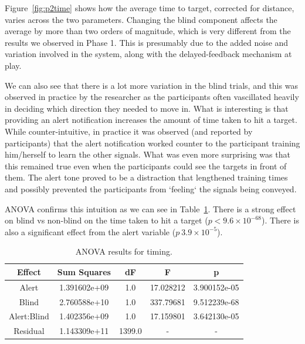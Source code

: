 \documentclass[
hidelinks,
12pt, %
oneside, %
english, %
doublespacing, %
headsepline, %
]{MastersDoctoralThesis} %
\begin{document}
Figure~\ref{fig:p2time} shows how the average time to target, corrected for distance, varies across the two parameters. Changing the blind component affects the average by more than two orders of magnitude, which is very different from the results we observed in Phase 1. This is presumably due to the added noise and variation involved in the system, along with the delayed-feedback mechanism at play.

We can also see that there is a lot more variation in the blind trials, and this was observed in practice by the researcher as the participants often vascillated heavily in deciding which direction they needed to move in. What is interesting is that providing an alert notification increases the amount of time taken to hit a target. While counter-intuitive, in practice it was observed (and reported by participants) that the alert notification worked counter to the participant training him/herself to learn the other signals. What was even more surprising was that this remained true even when the participants could see the targets in front of them. The alert tone proved to be a distraction that lengthened training times and possibly prevented the participants from `feeling` the signals being conveyed.

ANOVA confirms this intuition as we can see in Table~\ref{tab:p2timinganova}. There is a strong effect on blind vs non-blind on the time taken to hit a target ($p < 9.6 \times 10^{-68}$). There is also a significant effect from the alert variable ($p ~ 3.9 \times 10^{-5}$).

\begin{table}
	\centering
	\begin{tabular}{c|cccc}
		\toprule
		Effect & Sum Squares & dF & F & p\\
		\midrule
		Alert & 1.391602e+09 & 1.0 & 17.028212 & 3.900152e-05\\
		Blind & 2.760588e+10 & 1.0 & 337.79681 & 9.512239e-68\\
		Alert:Blind & 1.402356e+09 & 1.0 & 17.159801 & 3.642130e-05\\
		Residual & 1.143309e+11 & 1399.0 & - & -\\
		\bottomrule
	\end{tabular}
	\caption[Phase 1 Timing ANOVA]{ANOVA results for timing.}
	\label{tab:p2timinganova}
\end{table}
\end{document}
